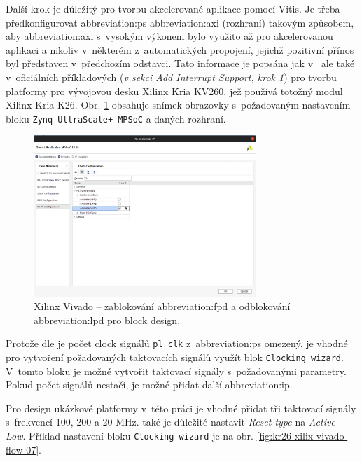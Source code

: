 \documentclass[a4paper, twoside, 11pt]{article}
\begin{document}
				Další krok je důležitý pro tvorbu akcelerované aplikace pomocí Vitis. Je třeba předkonfigurovat \gls{abbreviation:ps} \gls{abbreviation:axi} (rozhraní) takovým způsobem, aby \gls{abbreviation:axi} s~vysokým výkonem bylo využito až pro akcelerovanou aplikaci a nikoliv v~některém z~automatických propojení, jejichž pozitivní přínos byl představen v~předchozím odstavci. Tato informace je popsána jak v~\cite{hackster-getting-started-with-the-kria-kr260-in-vivado} ale také v~oficiálních příkladových \cite{xilinx-github-vitis-tutorials-step-1-create-the-vivado-hardware-design-and-generate-xsa} (\textit{v sekci Add Interrupt Support, krok 1}) pro tvorbu platformy pro vývojovou desku Xilinx Kria KV260, jež používá totožný modul Xilinx Kria K26. Obr. \ref{fig:kr26-xilix-vivado-flow-06} obsahuje snímek obrazovky s~požadovaným nastavením bloku \texttt{Zynq UltraScale+ MPSoC} a daných rozhraní.

				\begin{figure}[htbp!]
					\centering
					\includegraphics[width=0.75\textwidth]{src/png/kr26-xilinx-vivado-flow/kr26-xilix-vivado-flow-06.jpg}
					\caption{Xilinx Vivado – zablokování \gls{abbreviation:fpd} a odblokování \gls{abbreviation:lpd} pro block design.}
					\label{fig:kr26-xilix-vivado-flow-06}
				\end{figure}

				Protože dle \cite{xilinx-github-vitis-tutorials-step-1-create-the-vivado-hardware-design-and-generate-xsa} je počet clock signálů \texttt{pl\_clk} z~\gls{abbreviation:ps} omezený, je vhodné pro vytvoření požadovaných taktovacích signálů využít blok \texttt{Clocking wizard}. V~tomto bloku je možné vytvořit taktovací signály s~požadovanými parametry. Pokud počet signálů nestačí, je možné přidat další \gls{abbreviation:ip}.\par
				Pro design ukázkové platformy v~této práci je vhodné přidat tři taktovací signály s~frekvencí 100, 200 a 20 MHz. také je důležité nastavit \textit{Reset type} na \textit{Active Low}. Příklad nastavení bloku \texttt{Clocking wizard} je na obr. \ref{fig:kr26-xilix-vivado-flow-07}.
\end{document}
